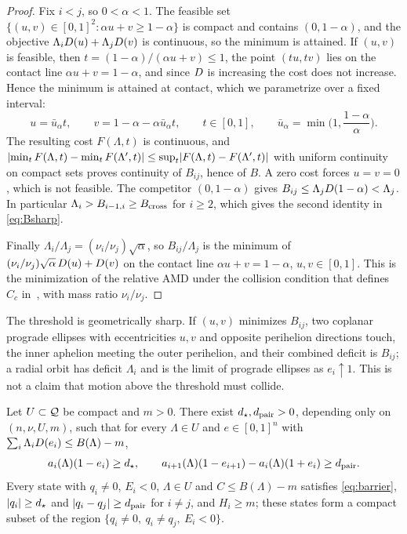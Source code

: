 \begin{proof}
Fix $i<j$, so $0<\alpha<1$. The feasible set $\{(u,v)\in[0,1]^2:\alpha u+v\ge1-\alpha\}$ is compact and contains $(0,1-\alpha)$, and the objective $\Lambda_iD(u)+\Lambda_jD(v)$ is continuous, so the minimum is attained. If $(u,v)$ is feasible, then $t=(1-\alpha)/(\alpha u+v)\le1$, the point $(tu,tv)$ lies on the contact line $\alpha u+v=1-\alpha$, and since $D$ is increasing the cost does not increase. Hence the minimum is attained at contact, which we parametrize over a fixed interval:
\begin{equation}
\label{eq:contact}
u=\bar u_\alpha t,\qquad v=1-\alpha-\alpha\bar u_\alpha t,\qquad t\in[0,1],\qquad \bar u_\alpha=\min\Big(1,\frac{1-\alpha}{\alpha}\Big).
\end{equation}
The resulting cost $F(\Lambda,t)$ is continuous, and $\lvert \min_tF(\Lambda,t)-\min_tF(\Lambda',t)\rvert\le\sup_t\lvert F(\Lambda,t)-F(\Lambda',t)\rvert$ with uniform continuity on compact sets proves continuity of $B_{ij}$, hence of $B$. A zero cost forces $u=v=0$, which is not feasible. The competitor $(0,1-\alpha)$ gives $B_{ij}\le\Lambda_jD(1-\alpha)<\Lambda_j$. In particular $\Lambda_i>B_{i-1,i}\ge B_{\mathrm{cross}}$ for $i\ge2$, which gives the second identity in \eqref{eq:Bsharp}.

Finally $\Lambda_i/\Lambda_j=(\nu_i/\nu_j)\sqrt\alpha$, so $B_{ij}/\Lambda_j$ is the minimum of $(\nu_i/\nu_j)\sqrt\alpha\,D(u)+D(v)$ on the contact line $\alpha u+v=1-\alpha$, $u,v\in[0,1]$. This is the minimization of the relative AMD under the collision condition that defines $C_c$ in~\cite[\S\S3.1--3.2]{LP17}, with mass ratio $\nu_i/\nu_j$.
\end{proof}

The threshold is geometrically sharp. If $(u,v)$ minimizes $B_{ij}$, two coplanar prograde ellipses with eccentricities $u,v$ and opposite perihelion directions touch, the inner aphelion meeting the outer perihelion, and their combined deficit is $B_{ij}$; a radial orbit has deficit $\Lambda_i$ and is the limit of prograde ellipses as $e_i\uparrow1$. This is not a claim that motion above the threshold must collide.

\begin{lemma}
\label{lem:uniform}
Let $U\subset\mathcal{Q}$ be compact and $m>0$. There exist $d_\star,d_{\mathrm{pair}}>0$, depending only on $(n,\nu,U,m)$, such that for every $\Lambda\in U$ and $e\in[0,1]^n$ with $\sum_i\Lambda_iD(e_i)\le B(\Lambda)-m$,
\begin{equation}
\label{eq:barrier}
a_i(\Lambda)(1-e_i)\ge d_\star,\qquad a_{i+1}(\Lambda)(1-e_{i+1})-a_i(\Lambda)(1+e_i)\ge d_{\mathrm{pair}}.
\end{equation}
Every state with $q_i\ne0$, $E_i<0$, $\Lambda\in U$ and $C\le B(\Lambda)-m$ satisfies \eqref{eq:barrier}, $\lvert q_i\rvert\ge d_\star$ and $\lvert q_i-q_j\rvert\ge d_{\mathrm{pair}}$ for $i\ne j$, and $H_i\ge m$; these states form a compact subset of the region $\{q_i\ne0,\ q_i\ne q_j,\ E_i<0\}$.
\end{lemma}

